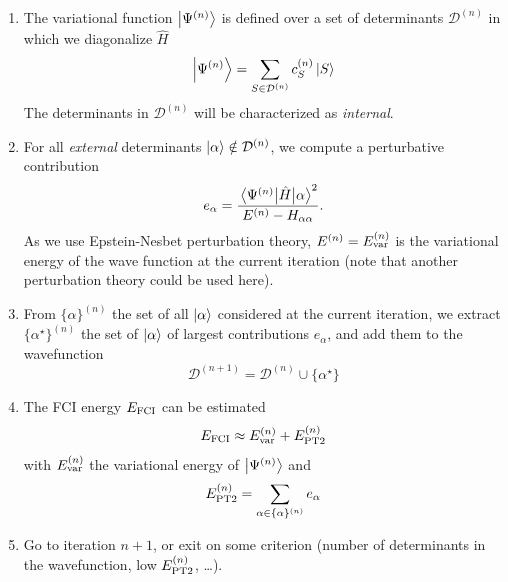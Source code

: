 \documentclass[./thesis.tex]{subfiles}
\begin{document}
\begin{enumerate}
\item

The variational function $\ket {\Psi^{(n)}}$ is defined over a set of determinants $  \mathcal{D}^{(n)}$ in which we diagonalize $\widehat{H}$
\begin{equation}
\ket{\Psi^{(n)}} = \sum_{S \in \mathcal{D}^{(n)}} c_S^{(n)} \ket{S}
\end{equation}
The determinants in $\mathcal{D}^{(n)}$ will be characterized as \emph{internal}.

\item
For all \emph{external} determinants ${\ket{\alpha}} \notin \mathcal{D}^{(n)}$, we compute a perturbative contribution
\begin{equation}
e_\alpha = \frac{\mel{\Psi^{(n)}}{\hat{H}}{\alpha}^2}{E^{(n)} - H_{\alpha \alpha}}.
\end{equation}
As we use Epstein-Nesbet perturbation theory, $E^{(n)}=E_\text{var}^{(n)}$ is the variational energy of the wave  function at the current iteration (note that another perturbation theory could be used here).

\item
From $\{ \alpha \}^{(n)}$ the set of all ${\ket{\alpha}}$ considered at the current iteration, we extract $\{ \alpha^\star \}^{(n)}$ the set of ${\ket{\alpha}}$ of largest contributions $e_\alpha$, and add them to the wavefunction
\begin{equation}
\mathcal{D}^{(n+1)} = \mathcal{D}^{(n)} \cup \{ \alpha^\star \}
\end{equation}

\item
The FCI energy $E_\text{FCI}$ can be estimated
\begin{equation}
E_\text{FCI} \approx E_\text{var}^{(n)} + E_\text{PT2}^{(n)}
\end{equation}
with $E_\text{var}^{(n)}$ the variational energy of $\ket {\Psi^{(n)}}$ and
\begin{equation}
E_\text{PT2}^{(n)} = \sum_{\alpha \in \{\alpha \}^{(n)}} e_\alpha
\end{equation}

\item
Go to iteration $n+1$, or exit on some criterion (number of determinants in the wavefunction, low $E_\text{PT2}^{(n)}$, \dots).

\end{enumerate}
\end{document}
